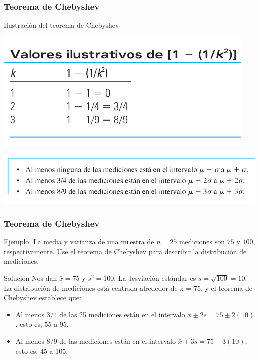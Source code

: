 \documentclass[spanish]{beamer}
\begin{document}
\begin{frame}
\frametitle{Teorema de Chebyshev}
Ilustración del teorema de Chebyshev
\begin{center}
\includegraphics[scale=0.4]{im18}
\end{center}
\begin{center}
\includegraphics[width=\textwidth]{im19}
\end{center}

\end{frame}
\begin{frame}
\frametitle{Teorema de Chebyshev}
Ejemplo. La media y varianza de una muestra de $n = 25$ mediciones son $75$ y $100$, respectivamente. Use el teorema de Chebyshev para describir la distribución de mediciones.

Solución Nos dan $\bar{x} =75$ y $s^2 = 100$. La desviación estándar es $s =\sqrt{100}=10$. La distribución de mediciones está centrada alrededor de x = 75, y el teorema de Chebyshev establece que:
\begin{itemize}
\item Al menos $3/4$ de las 25 mediciones están en el intervalo $\bar{x} \pm  2s = 75 \pm 2(10)$, esto es, $55$ a $95$.

\item Al menos $8/9$ de las mediciones están en el intervalo $\bar{x} \pm  3s = 75 \pm 3(10)$, esto es, 45 a 105.
\end{itemize}


\end{frame}
\end{document}
